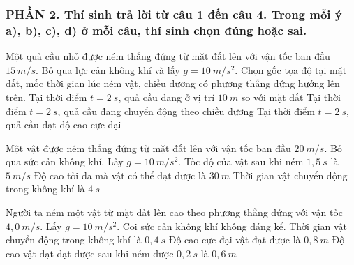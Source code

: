 \subsubsection*{PHẦN 2. Thí sinh trả lời từ câu 1 đến câu 4. Trong mỗi ý a), b), c), d) ở mỗi câu, thí sinh chọn đúng hoặc sai.}
\setcounter{ex}{0}
\begin{ex}%
Một quả cầu nhỏ được ném thẳng đứng từ mặt đất lên với vận tốc ban đầu $15\ m/s$. Bỏ qua lực cản không khí và lấy $g=10\ m/s^2$. Chọn gốc tọa độ tại mặt đất, mốc thời gian lúc ném vật, chiều dương có phương thẳng đứng hướng lên trên. 
{\True Tại thời điểm $t=2 \ s$, quả cầu đang ở vị trí $10\ m$ so với mặt đất}
{Tại thời điểm $t=2 \ s$, quả cầu đang chuyển động theo chiều dương}
{Tại thời điểm $t=2 \ s$, quả cầu đạt độ cao cực đại}
\end{ex}
\begin{ex}%
Một vật được ném thẳng đứng từ mặt đất lên với vận tốc ban đầu $20 \ m/s$. Bỏ qua sức cản không khí. Lấy $g=10 \ m/s^2$.
{\True Tốc độ của vật sau khi ném $1,5\ s$ là $5 \ m/s$} 
{Độ cao tối đa mà vật có thể đạt được là $30\ m$} 
{\True Thời gian vật chuyển động trong không khí là $4\ s$} 
\loigiai{}
\end{ex}
\begin{ex}%
Người ta ném một vật từ mặt đất lên cao theo phương thẳng đứng với vận tốc $4,0\ m/s$. Lấy $g=10 \ m/s^2$. Coi sức cản không khí không đáng kể.
{Thời gian vật chuyển động trong không khí là $0,4 \ s$} 
{\True Độ cao cực đại vật đạt được là $0,8 \ m$} 
{\True Độ cao vật đạt đạt được sau khi ném được $0,2\ s$ là $0,6\ m$} 
\loigiai{}
\end{ex}
